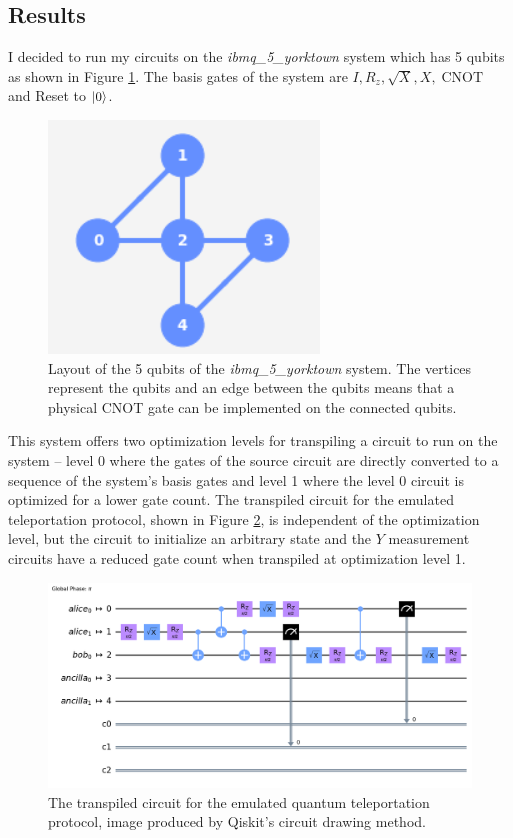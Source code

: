 \documentclass[prx,twocolumn]{revtex4-2}
\numberwithin{equation}{section}
\numberwithin{figure}{section}
\numberwithin{table}{section}
\DeclareMathOperator{\CNOT}{CNOT}
\begin{document}
\subsection{Results}
I decided to run my circuits on the \textit{ibmq\_5\_yorktown} system which has 5 qubits as shown in Figure
\ref{fig:qubit-layout}. The basis gates of the system are $I, R_z, \sqrt{X}, X, \CNOT$ and Reset to $\ket0$.
\begin{figure}
    \centering
    \includegraphics{images/qubit-architecture.png}
    \caption{Layout of the 5 qubits of the \textit{ibmq\_5\_yorktown} system. The vertices represent the qubits 
    and an edge between the qubits means that a physical CNOT gate can be implemented on the connected qubits.}
    \label{fig:qubit-layout}
\end{figure}

This system offers two optimization levels for transpiling a circuit to run on the system -- level 0 where 
the gates of the source circuit are directly converted to a sequence of the system's basis gates and level 1 
where the level 0 circuit is optimized for a lower gate count. The transpiled circuit for the emulated 
teleportation protocol, shown in Figure \ref{fig:transpiled-circuits}, is independent of the optimization 
level, but the circuit to initialize an arbitrary state and the $Y$ measurement circuits have a reduced gate 
count when transpiled at optimization level 1.

\begin{figure}
    \centering
    \includegraphics[width=\textwidth]{images/teleport_circ_opt_0.png}
    \caption{The transpiled circuit for the emulated quantum teleportation protocol, image produced by Qiskit's
    circuit drawing method.}
    \label{fig:transpiled-circuits}
\end{figure}
\end{document}
